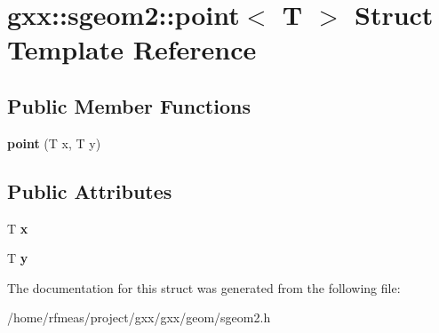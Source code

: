 \hypertarget{structgxx_1_1sgeom2_1_1point}{}\section{gxx\+:\+:sgeom2\+:\+:point$<$ T $>$ Struct Template Reference}
\label{structgxx_1_1sgeom2_1_1point}
\subsection*{Public Member Functions}
\begin{DoxyCompactItemize}
\item 
{\bfseries point} (T x, T y)\hypertarget{structgxx_1_1sgeom2_1_1point_a65550d57908ac36bf595c2c2038bed1e}{}\label{structgxx_1_1sgeom2_1_1point_a65550d57908ac36bf595c2c2038bed1e}

\end{DoxyCompactItemize}
\subsection*{Public Attributes}
\begin{DoxyCompactItemize}
\item 
T {\bfseries x}\hypertarget{structgxx_1_1sgeom2_1_1point_afdd1c7522e2bc74d624c54e6958d202a}{}\label{structgxx_1_1sgeom2_1_1point_afdd1c7522e2bc74d624c54e6958d202a}

\item 
T {\bfseries y}\hypertarget{structgxx_1_1sgeom2_1_1point_acce0dd33d7241a33d711666fea3f99eb}{}\label{structgxx_1_1sgeom2_1_1point_acce0dd33d7241a33d711666fea3f99eb}

\end{DoxyCompactItemize}


The documentation for this struct was generated from the following file\+:\begin{DoxyCompactItemize}
\item 
/home/rfmeas/project/gxx/gxx/geom/sgeom2.\+h\end{DoxyCompactItemize}
